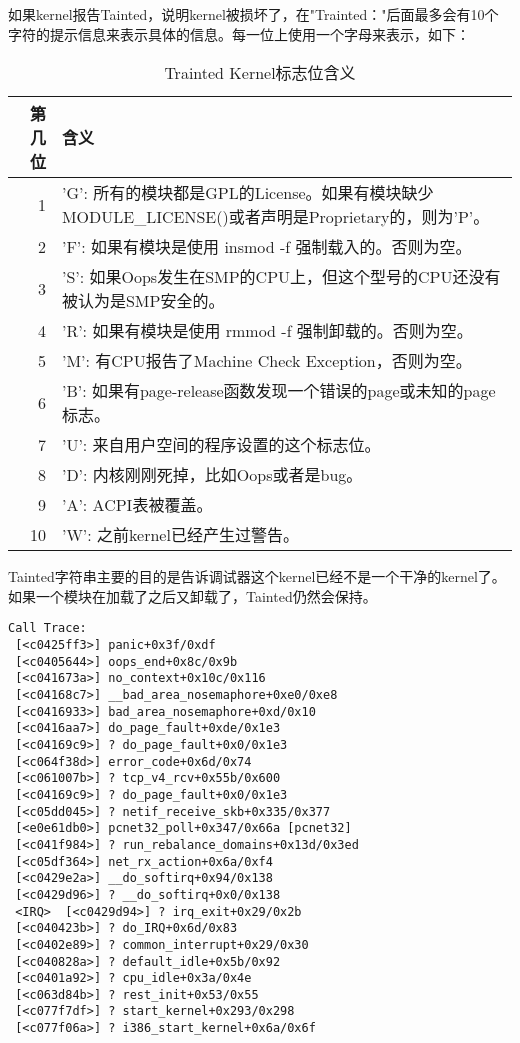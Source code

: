如果kernel报告Tainted，说明kernel被损坏了，在"Trainted："后面最多会有10个字符的提示信息来表示具体的信息。每一位上使用一个字母来表示，如下：

\begin{table}[!hbp]
\caption{Trainted Kernel标志位含义}
\begin{tabularx}{400pt}{r|X}
\hline
第几位 & 含义 \\
\hline
1 & 'G': 所有的模块都是GPL的License。如果有模块缺少MODULE\_LICENSE()或者声明是Proprietary的，则为'P'。\\
2 & 'F': 如果有模块是使用 insmod -f 强制载入的。否则为空。   \\
3 & 'S': 如果Oops发生在SMP的CPU上，但这个型号的CPU还没有被认为是SMP安全的。\\
4 & 'R': 如果有模块是使用 rmmod -f 强制卸载的。否则为空。    \\
5 & 'M': 有CPU报告了Machine Check Exception，否则为空。      \\
6 & 'B': 如果有page-release函数发现一个错误的page或未知的page标志。  \\
7 & 'U': 来自用户空间的程序设置的这个标志位。                \\
8 & 'D': 内核刚刚死掉，比如Oops或者是bug。                   \\
9 & 'A': ACPI表被覆盖。                                      \\
10 & 'W': 之前kernel已经产生过警告。                         \\
\hline
\end{tabularx}
\end{table}

Tainted字符串主要的目的是告诉调试器这个kernel已经不是一个干净的kernel了。如果一个模块在加载了之后又卸载了，Tainted仍然会保持。


\begin{lstlisting}
Call Trace:
 [<c0425ff3>] panic+0x3f/0xdf
 [<c0405644>] oops_end+0x8c/0x9b
 [<c041673a>] no_context+0x10c/0x116
 [<c04168c7>] __bad_area_nosemaphore+0xe0/0xe8
 [<c0416933>] bad_area_nosemaphore+0xd/0x10
 [<c0416aa7>] do_page_fault+0xde/0x1e3
 [<c04169c9>] ? do_page_fault+0x0/0x1e3
 [<c064f38d>] error_code+0x6d/0x74
 [<c061007b>] ? tcp_v4_rcv+0x55b/0x600
 [<c04169c9>] ? do_page_fault+0x0/0x1e3
 [<c05dd045>] ? netif_receive_skb+0x335/0x377
 [<e0e61db0>] pcnet32_poll+0x347/0x66a [pcnet32]
 [<c041f984>] ? run_rebalance_domains+0x13d/0x3ed
 [<c05df364>] net_rx_action+0x6a/0xf4
 [<c0429e2a>] __do_softirq+0x94/0x138
 [<c0429d96>] ? __do_softirq+0x0/0x138
 <IRQ>  [<c0429d94>] ? irq_exit+0x29/0x2b
 [<c040423b>] ? do_IRQ+0x6d/0x83
 [<c0402e89>] ? common_interrupt+0x29/0x30
 [<c040828a>] ? default_idle+0x5b/0x92
 [<c0401a92>] ? cpu_idle+0x3a/0x4e
 [<c063d84b>] ? rest_init+0x53/0x55
 [<c077f7df>] ? start_kernel+0x293/0x298
 [<c077f06a>] ? i386_start_kernel+0x6a/0x6f
\end{lstlisting}
 

